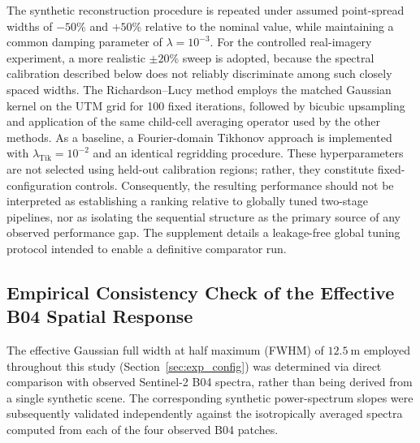\documentclass[journal]{IEEEtran}
\begin{document}
The synthetic reconstruction procedure is repeated under assumed point-spread widths of $-50\%$ and $+50\%$ relative to the nominal value, while maintaining a common damping parameter of $\lambda=10^{-3}$. For the controlled real-imagery experiment, a more realistic $\pm20\%$ sweep is adopted, because the spectral calibration described below does not reliably discriminate among such closely spaced widths. The Richardson--Lucy method employs the matched Gaussian kernel on the UTM grid for 100 fixed iterations, followed by bicubic upsampling and application of the same child-cell averaging operator used by the other methods. As a baseline, a Fourier-domain Tikhonov approach is implemented with $\lambda_{\mathrm{Tik}}=10^{-2}$ and an identical regridding procedure. These hyperparameters are not selected using held-out calibration regions; rather, they constitute fixed-configuration controls. Consequently, the resulting performance should not be interpreted as establishing a ranking relative to globally tuned two-stage pipelines, nor as isolating the sequential structure as the primary source of any observed performance gap. The supplement details a leakage-free global tuning protocol intended to enable a definitive comparator run.

\subsection{Empirical Consistency Check of the Effective B04 Spatial Response}
\label{sec:psf_calibration}

The effective Gaussian full width at half maximum (FWHM) of $12.5~\mathrm{m}$ employed throughout this study (Section~\ref{sec:exp_config}) was determined via direct comparison with observed Sentinel-2 B04 spectra, rather than being derived from a single synthetic scene. The corresponding synthetic power-spectrum slopes were subsequently validated independently against the isotropically averaged spectra computed from each of the four observed B04 patches.
\end{document}
